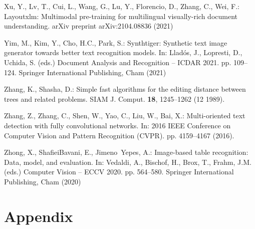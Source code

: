 \documentclass[runningheads]{llncs}
\begin{document}
\begin{thebibliography}{10}
Xu, Y., Lv, T., Cui, L., Wang, G., Lu, Y., Florencio, D., Zhang, C., Wei, F.:
  Layoutxlm: Multimodal pre-training for multilingual visually-rich document
  understanding. arXiv preprint arXiv:2104.08836  (2021)

Yim, M., Kim, Y., Cho, H.C., Park, S.: Synthtiger: Synthetic text image
  generator towards better text recognition models. In: Llad{\'o}s, J.,
  Lopresti, D., Uchida, S. (eds.) Document Analysis and Recognition -- ICDAR
  2021. pp. 109--124. Springer International Publishing, Cham (2021)

Zhang, K., Shasha, D.: Simple fast algorithms for the editing distance between
  trees and related problems. SIAM J. Comput.  \textbf{18},  1245--1262 (12
  1989). 

Zhang, Z., Zhang, C., Shen, W., Yao, C., Liu, W., Bai, X.: Multi-oriented text
  detection with fully convolutional networks. In: 2016 IEEE Conference on
  Computer Vision and Pattern Recognition (CVPR). pp. 4159--4167 (2016).

Zhong, X., ShafieiBavani, E., Jimeno~Yepes, A.: Image-based table recognition:
  Data, model, and evaluation. In: Vedaldi, A., Bischof, H., Brox, T., Frahm,
  J.M. (eds.) Computer Vision -- ECCV 2020. pp. 564--580. Springer
  International Publishing, Cham (2020)

\end{thebibliography}
 
\clearpage



\appendix
\renewcommand{\thesection}{\Alph{section}}
\renewcommand{\thesubsection}{\Alph{section}.\arabic{subsection}}
\setcounter{figure}{0}
\renewcommand{\thefigure}{\Alph{figure}}
\section{Appendix}
\end{document}
